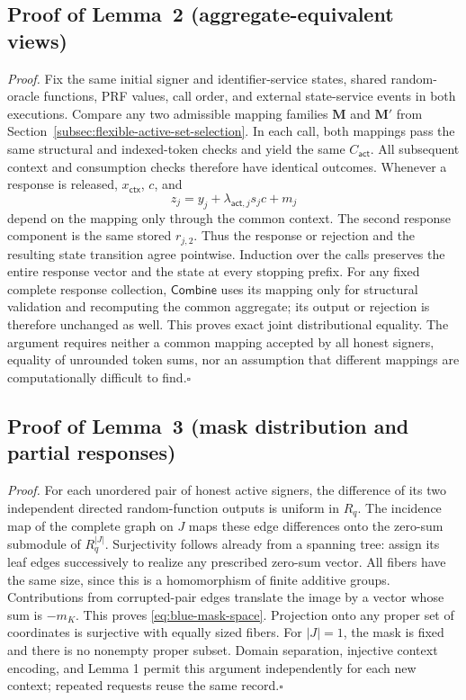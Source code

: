 \documentclass[lettersize,journal]{IEEEtran}
\begin{document}
\subsection{Proof of Lemma~2 (aggregate-equivalent views)}
\label{app:talon-lemma2-proof}

{
\emph{Proof.}
Fix the same initial signer and identifier-service states, shared
random-oracle functions, PRF values, call order, and external state-service
events in both executions. Compare any two admissible mapping families
$\mathbf M$ and $\mathbf M'$ from
Section~\ref{subsec:flexible-active-set-selection}. In each call, both
mappings pass the same structural and indexed-token checks and yield the
same $C_{\mathsf{act}}$. All subsequent context and consumption checks
therefore have identical outcomes. Whenever a response is released,
$x_{\mathsf{ctx}}$, $c$, and
\[
z_j=y_j+\lambda_{\mathsf{act},j}s_jc+m_j
\]
depend on the mapping only through the common context. The second response
component is the same stored $r_{j,2}$. Thus the response or rejection and
the resulting state transition agree pointwise. Induction over the calls
preserves the entire response vector and the state at every stopping prefix.
For any fixed complete response collection, $\mathsf{Combine}$ uses its
mapping only for structural validation and recomputing the common aggregate;
its output or rejection is therefore unchanged as well. This proves exact
joint distributional equality. The argument requires neither a common
mapping accepted by all honest signers, equality of unrounded token sums,
nor an assumption that different mappings are computationally difficult
to find.\hfill$\square$
}

\subsection{Proof of Lemma~3 (mask distribution and partial responses)}
\label{app:talon-lemma3-proof}

\emph{Proof.}
For each unordered pair of honest active signers, the difference of its two
independent directed random-function outputs is uniform in $R_q$. The
incidence map of the complete graph on $J$ maps these edge differences onto
the zero-sum submodule of $R_q^{|J|}$. Surjectivity follows already from a
spanning tree: assign its leaf edges successively to realize any prescribed
zero-sum vector. All fibers have the same size, since this is a homomorphism
of finite additive groups. Contributions from corrupted-pair edges translate
the image by a vector whose sum is $-m_K$. This proves
\eqref{eq:blue-mask-space}. Projection onto any proper set of coordinates
is surjective with equally sized fibers. For $|J|=1$, the mask is fixed and
there is no nonempty proper subset. Domain separation, injective context
encoding, and Lemma 1 permit this argument independently for each new
context; repeated requests reuse the same record.\hfill$\square$
\end{document}
